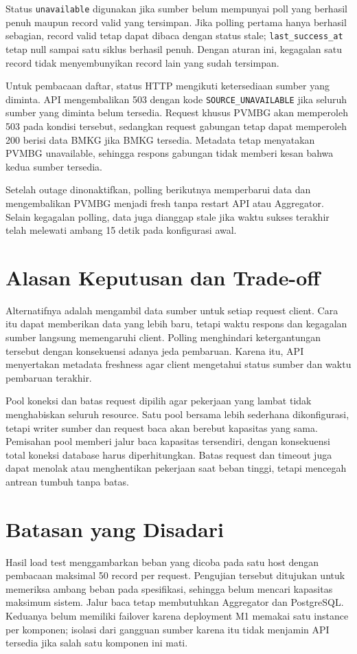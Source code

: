 Status \texttt{unavailable} digunakan jika sumber belum mempunyai poll yang berhasil penuh maupun record valid yang tersimpan. Jika polling pertama hanya berhasil sebagian, record valid tetap dapat dibaca dengan status stale; \texttt{last\_success\_at} tetap null sampai satu siklus berhasil penuh. Dengan aturan ini, kegagalan satu record tidak menyembunyikan record lain yang sudah tersimpan.

Untuk pembacaan daftar, status HTTP mengikuti ketersediaan sumber yang diminta. API mengembalikan 503 dengan kode \texttt{SOURCE\_UNAVAILABLE} jika seluruh sumber yang diminta belum tersedia. Request khusus PVMBG akan memperoleh 503 pada kondisi tersebut, sedangkan request gabungan tetap dapat memperoleh 200 berisi data BMKG jika BMKG tersedia. Metadata tetap menyatakan PVMBG unavailable, sehingga respons gabungan tidak memberi kesan bahwa kedua sumber tersedia.

Setelah outage dinonaktifkan, polling berikutnya memperbarui data dan mengembalikan PVMBG menjadi fresh tanpa restart API atau Aggregator. Selain kegagalan polling, data juga dianggap stale jika waktu sukses terakhir telah melewati ambang 15 detik pada konfigurasi awal.

\section{Alasan Keputusan dan Trade-off}
Alternatifnya adalah mengambil data sumber untuk setiap request client. Cara itu dapat memberikan data yang lebih baru, tetapi waktu respons dan kegagalan sumber langsung memengaruhi client. Polling menghindari ketergantungan tersebut dengan konsekuensi adanya jeda pembaruan. Karena itu, API menyertakan metadata freshness agar client mengetahui status sumber dan waktu pembaruan terakhir.

Pool koneksi dan batas request dipilih agar pekerjaan yang lambat tidak menghabiskan seluruh resource. Satu pool bersama lebih sederhana dikonfigurasi, tetapi writer sumber dan request baca akan berebut kapasitas yang sama. Pemisahan pool memberi jalur baca kapasitas tersendiri, dengan konsekuensi total koneksi database harus diperhitungkan. Batas request dan timeout juga dapat menolak atau menghentikan pekerjaan saat beban tinggi, tetapi mencegah antrean tumbuh tanpa batas.

\section{Batasan yang Disadari}
Hasil load test menggambarkan beban yang dicoba pada satu host dengan pembacaan maksimal 50 record per request. Pengujian tersebut ditujukan untuk memeriksa ambang beban pada spesifikasi, sehingga belum mencari kapasitas maksimum sistem. Jalur baca tetap membutuhkan Aggregator dan PostgreSQL. Keduanya belum memiliki failover karena deployment M1 memakai satu instance per komponen; isolasi dari gangguan sumber karena itu tidak menjamin API tersedia jika salah satu komponen ini mati.

